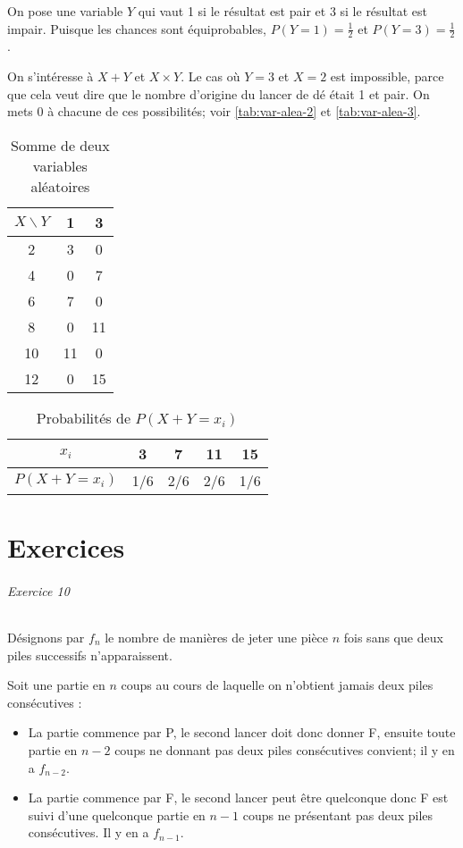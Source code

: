 \documentclass[10pt,a4paper,french]{article}
\begin{document}
On pose une variable $Y$ qui vaut 1 si le résultat est pair et 3 si le résultat est impair. Puisque les chances sont équiprobables, $P(Y=1) = \frac{1}{2}$ et $P(Y=3) = \frac{1}{2}$.

On s'intéresse à $X+Y$ et $X \times Y$. Le cas où $Y=3$ et $X=2$ est impossible, parce que cela veut dire que le nombre d'origine du lancer de dé était 1 et pair. On mets 0 à chacune de ces possibilités; voir \autoref{tab:var-alea-2} et \autoref{tab:var-alea-3}.

\begin{table}
\caption{\label{tab:var-alea-2} Somme de deux variables aléatoires}
\centering
\begin{tabular}{c|cc}
$X \backslash Y$ & 1 & 3\\
\hline
2 & 3 & 0\\
4 & 0 & 7\\
6 & 7 & 0\\
8 & 0 & 11\\
10 & 11 & 0\\
12 & 0 & 15\\
\end{tabular}
\end{table}

\begin{table}
\caption{\label{tab:var-alea-3} Probabilités de $P(X+Y = x_i)$}
\centering
\begin{tabular}{c|cccc}
$x_i$ & 3 & 7 & 11 & 15\\
\hline
$P(X+Y=x_i)$ & 1/6 & 2/6 & 2/6 & 1/6\\
\end{tabular}
\end{table}






\part{Exercices}

\paragraph{Exercice 10}
Désignons par $f_n$ le nombre de manières de jeter une pièce $n$ fois sans que deux piles successifs n'apparaissent.

Soit une partie en $n$ coups au cours de laquelle on n'obtient jamais deux piles consécutives :
\begin{itemize}
\item La partie commence par P, le second lancer doit donc donner F, ensuite toute partie en $n-2$ coups ne donnant pas deux piles consécutives convient; il y en a $f_{n-2}$.
\item La partie commence par F, le second lancer peut être quelconque donc F est suivi d'une quelconque partie en $n-1$ coups ne présentant pas deux piles consécutives. Il y en a $f_{n-1}$.
\end{itemize}
\end{document}
